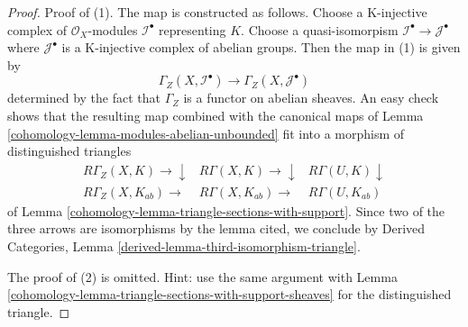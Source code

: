 \begin{proof}

Proof of (1). The map is constructed as follows. Choose a K-injective complex
of $\mathcal{O}_X$-modules $\mathcal{I}^\bullet$ representing $K$.
Choose a quasi-isomorpism
$\mathcal{I}^\bullet \to \mathcal{J}^\bullet$ where $\mathcal{J}^\bullet$
is a K-injective complex of abelian groups. Then the map in (1)
is given by
$$
\Gamma_Z(X, \mathcal{I}^\bullet) \to \Gamma_Z(X, \mathcal{J}^\bullet)
$$
determined by the fact that $\Gamma_Z$ is a functor on abelian sheaves.
An easy check shows that the resulting map combined with the canonical
maps of Lemma \ref{cohomology-lemma-modules-abelian-unbounded}
fit into a morphism of distinguished triangles
$$
\begin{array}{ccc}R\Gamma_Z(X, K) \longrightarrow\downarrow & R\Gamma(X, K) \longrightarrow\downarrow & R\Gamma(U, K) \downarrow \\ R\Gamma_Z(X, K_{ab}) \longrightarrow & R\Gamma(X, K_{ab}) \longrightarrow & R\Gamma(U, K_{ab})\end{array}
$$
of Lemma \ref{cohomology-lemma-triangle-sections-with-support}.
Since two of the three arrows are isomorphisms by the lemma cited,
we conclude by Derived Categories, Lemma
\ref{derived-lemma-third-isomorphism-triangle}.

\medskip\noindent
The proof of (2) is omitted. Hint: use the same argument with
Lemma \ref{cohomology-lemma-triangle-sections-with-support-sheaves}
for the distinguished triangle.
\end{proof}

